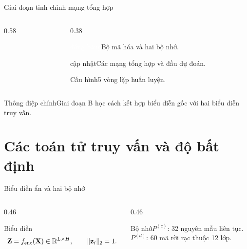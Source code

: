 \documentclass[aspectratio=169]{beamer}
\newcommand{\takeaway}[1]{\begin{alertblock}{Thông điệp chính}#1\end{alertblock}}
\newcommand{\freeze}{\textcolor{white}{đóng băng}}
\newcommand{\update}{\textcolor{red!70!black}{cập nhật}}
\begin{document}
\begin{frame}{Giai đoạn tinh chỉnh mạng tổng hợp}
  \begin{columns}[T,onlytextwidth]
    \begin{column}{0.58\textwidth}\end{column}
    \begin{column}{0.38\textwidth}
      \begin{block}{\freeze}Bộ mã hóa và hai bộ nhớ.\end{block}
      \begin{alertblock}{\update}Các mạng tổng hợp và đầu dự đoán.\end{alertblock}
      \begin{exampleblock}{Cấu hình}5 vòng lặp huấn luyện.\end{exampleblock}
    \end{column}
  \end{columns}
  \takeaway{Giai đoạn B học cách kết hợp biểu diễn gốc với hai biểu diễn truy vấn.}
\end{frame}

\section{Các toán tử truy vấn và độ bất định}

\begin{frame}{Biểu diễn ẩn và hai bộ nhớ}
  \begin{columns}[T,onlytextwidth]
    \begin{column}{0.46\textwidth}\begin{block}{Biểu diễn}\[\mathbf Z=f_{\rm enc}(\mathbf X)\in\mathbb R^{L\times H},\qquad \lVert\mathbf z_i\rVert_2=1.\]\end{block}\end{column}
    \begin{column}{0.46\textwidth}\begin{block}{Bộ nhớ}\(P^{(c)}\): 32 nguyên mẫu liên tục.\\\(P^{(d)}\): 60 mã rời rạc thuộc 12 lớp.\end{block}\end{column}
  \end{columns}
  \begin{center}
  \end{center}
\end{frame}
\end{document}

